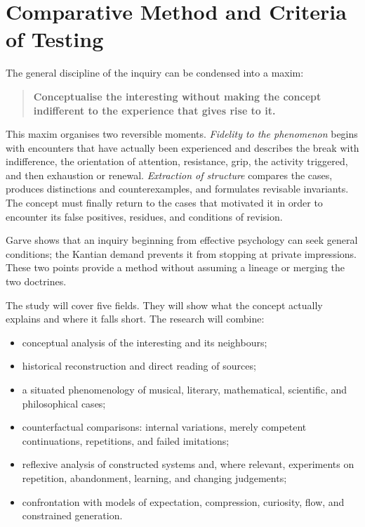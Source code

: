 \documentclass[11pt,a4paper]{article}
\begin{document}
\section{Comparative Method and Criteria of Testing}

The general discipline of the inquiry can be condensed into a maxim:

\begin{quote}
\textbf{Conceptualise the interesting without making the concept indifferent to
the experience that gives rise to it.}
\end{quote}

This maxim organises two reversible moments. \emph{Fidelity to the phenomenon}
begins with encounters that have actually been experienced and describes the
break with indifference, the orientation of attention, resistance, grip, the
activity triggered, and then exhaustion or renewal. \emph{Extraction of
structure} compares the cases, produces distinctions and counterexamples, and
formulates revisable invariants. The concept must finally return to the cases
that motivated it in order to encounter its false positives, residues, and
conditions of revision.

Garve shows that an inquiry beginning from effective psychology can seek general
conditions; the Kantian demand prevents it from stopping at private impressions.
These two points provide a method without assuming a lineage or merging the two
doctrines.

The study will cover five fields. They will show what the concept actually
explains and where it falls short. The research will combine:

\begin{itemize}
  \item conceptual analysis of the interesting and its neighbours;
  \item historical reconstruction and direct reading of sources;
  \item a situated phenomenology of musical, literary, mathematical,
        scientific, and philosophical cases;
  \item counterfactual comparisons: internal variations, merely competent
        continuations, repetitions, and failed imitations;
  \item reflexive analysis of constructed systems and, where relevant,
        experiments on repetition, abandonment, learning, and changing
        judgements;
  \item confrontation with models of expectation, compression, curiosity,
        flow, and constrained generation.
\end{itemize}
\end{document}
